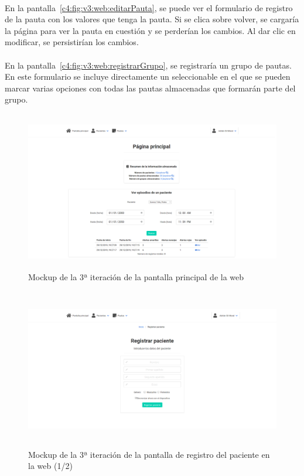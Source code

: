\paragraph{}
En la pantalla~\ref{c4:fig:v3:web:editarPauta}, se puede ver el formulario de registro de la pauta con los valores que tenga la pauta. Si se clica sobre volver, se cargaría la página para ver la pauta en cuestión y se perderían los cambios. Al dar clic en modificar, se persistirían los cambios.

\paragraph{}
En la pantalla~\ref{c4:fig:v3:web:registrarGrupo}, se registraría un grupo de pautas. En este formulario se incluye directamente un seleccionable en el que se pueden marcar varias opciones con todas las pautas almacenadas que formarán parte del grupo.

\begin{figure}[H]
    \centering
    \includegraphics[height=7cm, width=\textwidth]{Imagenes/04DescProblema/mockups/v3/web/01-index.png}
    \caption[Mockup de la 3ª iteración de la pantalla principal de la web]{Mockup de la 3ª iteración de la pantalla principal de la web}
    \label{c4:fig:v3:web:index}
\end{figure}

\begin{figure}[H]
    \centering
    \includegraphics[height=7cm, width=\textwidth]{Imagenes/04DescProblema/mockups/v3/web/02-registrarPaciente.png}
    \caption[Mockup de la 3ª iteración de la pantalla de registro del paciente en la web (1/2)]{Mockup de la 3ª iteración de la pantalla de registro del paciente en la web (1/2)}
    \label{c4:fig:v3:web:registroPaciente}
\end{figure}

